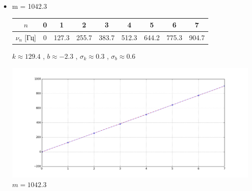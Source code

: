 \documentclass[8pt]{article}
\begin{document}
    \begin{itemize}
        \item m = 1042.3
                    \begin{center}
                    \begin{tabular}{|c|c|c|c|c|c|c|c|c|}
                            \hline 
                                $n$ & 0 & 1 & 2 & 3 & 4 & 5 & 6 & 7 \\
                            \hline
                                $\nu_n$ [Гц] &0&127.3&255.7&383.7&512.3&644.2&775.3&904.7\\
                            \hline
                    \end{tabular}
                    \end{center}

        \indent $k \approx 129.4$  , $b \approx -2.3$ , $\sigma_k \approx 0.3$ , $\sigma_b \approx 0.6$ \\
        
        \begin{center} 
            \includegraphics[width=5in]{m0.png} \\ \tiny{$m = 1042.3$}
        \end{center}


\end{itemize}
\end{document}
